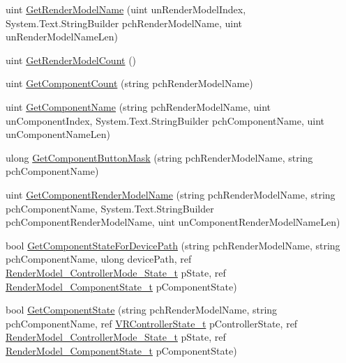 \begin{DoxyCompactItemize}
\item 
uint \mbox{\hyperlink{class_valve_1_1_v_r_1_1_c_v_r_render_models_aa45f9059f410da9f6946d41dad29561c}{Get\+Render\+Model\+Name}} (uint un\+Render\+Model\+Index, System.\+Text.\+String\+Builder pch\+Render\+Model\+Name, uint un\+Render\+Model\+Name\+Len)
\item 
uint \mbox{\hyperlink{class_valve_1_1_v_r_1_1_c_v_r_render_models_ae327ea4ed3891f4dc5dfadc349d099ac}{Get\+Render\+Model\+Count}} ()
\item 
uint \mbox{\hyperlink{class_valve_1_1_v_r_1_1_c_v_r_render_models_a568ad8302d430ae46af582059489a5dd}{Get\+Component\+Count}} (string pch\+Render\+Model\+Name)
\item 
uint \mbox{\hyperlink{class_valve_1_1_v_r_1_1_c_v_r_render_models_aff8d40ef614d7ecfaadac708a7d4f04d}{Get\+Component\+Name}} (string pch\+Render\+Model\+Name, uint un\+Component\+Index, System.\+Text.\+String\+Builder pch\+Component\+Name, uint un\+Component\+Name\+Len)
\item 
ulong \mbox{\hyperlink{class_valve_1_1_v_r_1_1_c_v_r_render_models_af4d1ca37dde0f9fcd1d5d155cb128f84}{Get\+Component\+Button\+Mask}} (string pch\+Render\+Model\+Name, string pch\+Component\+Name)
\item 
uint \mbox{\hyperlink{class_valve_1_1_v_r_1_1_c_v_r_render_models_a1fb89266de3f332bc3c51b623943eb2d}{Get\+Component\+Render\+Model\+Name}} (string pch\+Render\+Model\+Name, string pch\+Component\+Name, System.\+Text.\+String\+Builder pch\+Component\+Render\+Model\+Name, uint un\+Component\+Render\+Model\+Name\+Len)
\item 
bool \mbox{\hyperlink{class_valve_1_1_v_r_1_1_c_v_r_render_models_ad8b4389985fb3dad9cfb1c4525f25ad5}{Get\+Component\+State\+For\+Device\+Path}} (string pch\+Render\+Model\+Name, string pch\+Component\+Name, ulong device\+Path, ref \mbox{\hyperlink{struct_valve_1_1_v_r_1_1_render_model___controller_mode___state__t}{Render\+Model\+\_\+\+Controller\+Mode\+\_\+\+State\+\_\+t}} p\+State, ref \mbox{\hyperlink{struct_valve_1_1_v_r_1_1_render_model___component_state__t}{Render\+Model\+\_\+\+Component\+State\+\_\+t}} p\+Component\+State)
\item 
bool \mbox{\hyperlink{class_valve_1_1_v_r_1_1_c_v_r_render_models_afda07fd17044f2e257525df29febea5a}{Get\+Component\+State}} (string pch\+Render\+Model\+Name, string pch\+Component\+Name, ref \mbox{\hyperlink{struct_valve_1_1_v_r_1_1_v_r_controller_state__t}{V\+R\+Controller\+State\+\_\+t}} p\+Controller\+State, ref \mbox{\hyperlink{struct_valve_1_1_v_r_1_1_render_model___controller_mode___state__t}{Render\+Model\+\_\+\+Controller\+Mode\+\_\+\+State\+\_\+t}} p\+State, ref \mbox{\hyperlink{struct_valve_1_1_v_r_1_1_render_model___component_state__t}{Render\+Model\+\_\+\+Component\+State\+\_\+t}} p\+Component\+State)

\end{DoxyCompactItemize}

